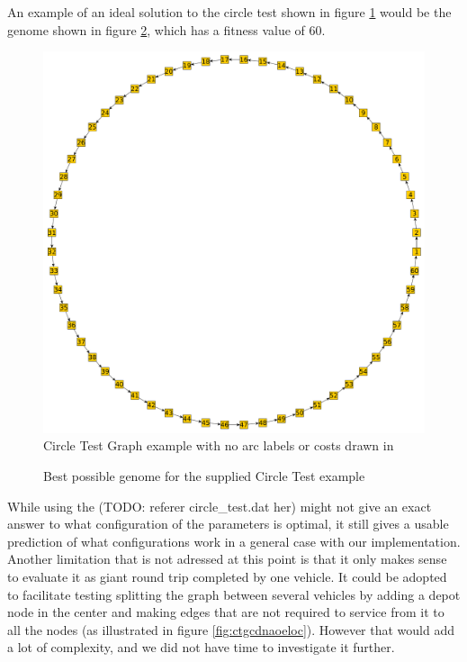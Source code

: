 An example of an ideal solution to the circle test shown in figure \ref{fig:ctgnaloc} would be the genome shown in figure \ref{fig:bpgftscte}, which has a fitness value of 60.

\begin{figure}[thbp]
	\centerline{\includegraphics[width=\textwidth]{figures/CircleTests/CircleTestIllustrations/Circle_Test_Graph-No_arc_labels_or_costs.pdf}}
	\caption{Circle Test Graph example with no arc labels or costs drawn in}
	\label{fig:ctgnaloc}
\end{figure}

\begin{figure}[thbp]
	\noindent
	\caption{Best possible genome for the supplied Circle Test example}
	\label{fig:bpgftscte}
\end{figure}

While using the (TODO: referer circle\_test.dat her) might not give an exact answer to what configuration of the parameters is optimal, it still gives a usable prediction of what configurations work in a general case with our implementation. Another limitation that is not adressed at this point is that it only makes sense to evaluate it as giant round trip completed by one vehicle. It could be adopted to facilitate testing splitting the graph between several vehicles by adding a depot node in the center and making edges that are not required to service from it to all the nodes (as illustrated in figure \ref{fig:ctgcdnaoeloc}). However that would add a lot of complexity, and we did not have time to investigate it further.

